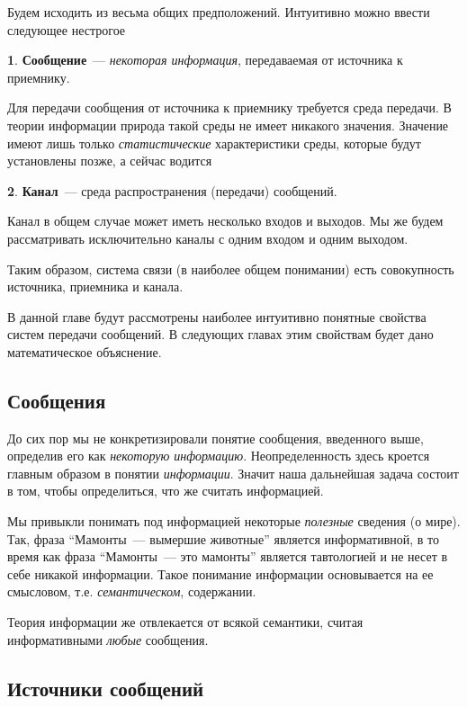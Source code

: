 \documentclass[12pt,a4paper,openright]{book}
\theoremstyle{definition}
\newtheorem{definition}{\textls[150]{Определение}}[chapter]
\numberwithin{equation}{chapter}
\begin{document}
	Будем исходить из весьма общих предположений. Интуитивно можно ввести следующее нестрогое
	\begin{definition}
		\textbf{Сообщение}~--- \textit{некоторая информация}, передаваемая от источника к приемнику.
	\end{definition}

	Для передачи сообщения от источника к приемнику требуется среда передачи. В теории информации природа такой среды не имеет никакого значения. Значение имеют лишь только \textit{статистические} характеристики среды, которые будут установлены позже, а сейчас водится
	\begin{definition}
		\textbf{Канал}~--- среда распространения (передачи) сообщений.
	\end{definition}
	Канал в общем случае может иметь несколько входов и выходов. Мы же будем рассматривать исключительно каналы с одним входом и одним выходом.

	Таким образом, система связи (в наиболее общем понимании) есть совокупность источника, приемника и канала.

	В данной главе будут рассмотрены наиболее интуитивно понятные свойства систем передачи сообщений. В следующих главах этим свойствам будет дано математическое объяснение.





	\subsection{Сообщения}

	До сих пор мы не конкретизировали понятие сообщения, введенного выше, определив его как \textit{некоторую информацию}. Неопределенность здесь кроется главным образом в понятии \textit{информации}. Значит наша дальнейшая задача состоит в том, чтобы определиться, что же считать информацией.

	Мы привыкли понимать под информацией некоторые \textit{полезные} сведения (о мире). Так, фраза ``Мамонты~--- вымершие животные'' является информативной, в то время как фраза ``Мамонты~--- это мамонты'' является тавтологией и не несет в себе никакой информации. Такое понимание информации основывается на ее смысловом, т.е. \textit{семантическом}, содержании.

	Теория информации же отвлекается от всякой семантики, считая информативными \textit{любые} сообщения.




	\subsection{Источники сообщений}
\end{document}
